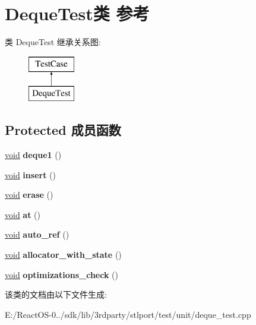 \hypertarget{class_deque_test}{}\section{Deque\+Test类 参考}
\label{class_deque_test}
类 Deque\+Test 继承关系图\+:\begin{figure}[H]
\begin{center}
\leavevmode
\includegraphics[height=2.000000cm]{class_deque_test}
\end{center}
\end{figure}
\subsection*{Protected 成员函数}
\begin{DoxyCompactItemize}
\item 
\mbox{\label{class_deque_test_a33f0f79b7d7f66456d1977858c048163}} 
\hyperlink{interfacevoid}{void} {\bfseries deque1} ()
\item 
\mbox{\label{class_deque_test_a82c6ae869e6c301a3966ea140887ae5d}} 
\hyperlink{interfacevoid}{void} {\bfseries insert} ()
\item 
\mbox{\label{class_deque_test_a09eda2f55230d979d234f1b9363178f9}} 
\hyperlink{interfacevoid}{void} {\bfseries erase} ()
\item 
\mbox{\label{class_deque_test_a39c7c7fb5b7bc40de62910cd8f3f4ce3}} 
\hyperlink{interfacevoid}{void} {\bfseries at} ()
\item 
\mbox{\label{class_deque_test_a383abda6add3a5d0bfe5757b32f1b7df}} 
\hyperlink{interfacevoid}{void} {\bfseries auto\+\_\+ref} ()
\item 
\mbox{\label{class_deque_test_acc08d585358bfa8bfb93c146c3125324}} 
\hyperlink{interfacevoid}{void} {\bfseries allocator\+\_\+with\+\_\+state} ()
\item 
\mbox{\label{class_deque_test_a0329c047fd9380f70a8f0d02e96e7c22}} 
\hyperlink{interfacevoid}{void} {\bfseries optimizations\+\_\+check} ()
\end{DoxyCompactItemize}


该类的文档由以下文件生成\+:\begin{DoxyCompactItemize}
\item 
E\+:/\+React\+O\+S-\/0../sdk/lib/3rdparty/stlport/test/unit/deque\+\_\+test.\+cpp\end{DoxyCompactItemize}
